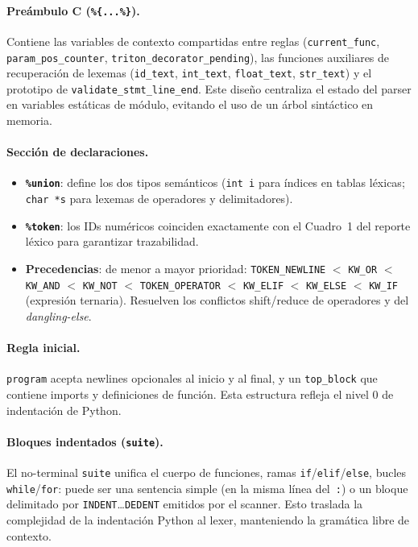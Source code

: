 \paragraph{Preámbulo C (\texttt{\%\{...\%\}}).}
Contiene las variables de contexto compartidas entre reglas (\texttt{current\_func},
\texttt{param\_pos\_counter}, \texttt{triton\_decorator\_pending}), las funciones
auxiliares de recuperación de lexemas (\texttt{id\_text}, \texttt{int\_text},
\texttt{float\_text}, \texttt{str\_text}) y el prototipo de
\texttt{validate\_stmt\_line\_end}. Este diseño centraliza el estado del parser
en variables estáticas de módulo, evitando el uso de un árbol sintáctico en
memoria.

\paragraph{Sección de declaraciones.}
\begin{itemize}
  \item \textbf{\texttt{\%union}}: define los dos tipos semánticos (\texttt{int i}
    para índices en tablas léxicas; \texttt{char *s} para lexemas de operadores
    y delimitadores).
  \item \textbf{\texttt{\%token}}: los IDs numéricos coinciden exactamente con el
    Cuadro~1 del reporte léxico para garantizar trazabilidad.
  \item \textbf{Precedencias}: de menor a mayor prioridad: \texttt{TOKEN\_NEWLINE}
    $<$ \texttt{KW\_OR} $<$ \texttt{KW\_AND} $<$ \texttt{KW\_NOT} $<$
    \texttt{TOKEN\_OPERATOR} $<$ \texttt{KW\_ELIF} $<$ \texttt{KW\_ELSE} $<$
    \texttt{KW\_IF} (expresión ternaria). Resuelven los conflictos
    shift/reduce de operadores y del \textit{dangling-else}.
\end{itemize}

\paragraph{Regla inicial.}
\texttt{program} acepta newlines opcionales al inicio y al final, y un
\texttt{top\_block} que contiene imports y definiciones de función. Esta
estructura refleja el nivel 0 de indentación de Python.

\paragraph{Bloques indentados (\texttt{suite}).}
El no-terminal \texttt{suite} unifica el cuerpo de funciones, ramas
\texttt{if}/\texttt{elif}/\texttt{else}, bucles \texttt{while}/\texttt{for}:
puede ser una sentencia simple (en la misma línea del~\texttt{:}) o un bloque
delimitado por \texttt{INDENT}\ldots\texttt{DEDENT} emitidos por el scanner.
Esto traslada la complejidad de la indentación Python al lexer, manteniendo
la gramática libre de contexto.

